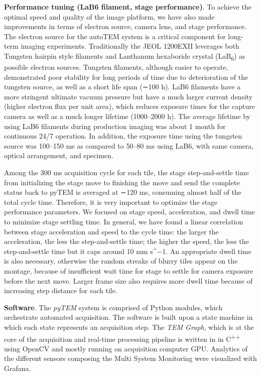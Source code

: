 \documentclass{article}
\begin{document}
{\noindent\textbf{Performance tuning (LaB6 filament, stage performance)}. To achieve the optimal speed and quality of the image platform, we have also made improvements in terms of electron source, camera lens, and stage performance. The electron source for the autoTEM system is a critical component for long-term imaging experiments. Traditionally the JEOL 1200EXII leverages both Tungsten hairpin style filaments and Lanthanum hexaboride crystal (LaB\textsubscript{6}) as possible electron sources. Tungsten filaments, although easier to operate, demonstrated poor stability for long periods of time due to deterioration of the tungsten source, as well as a short life span (∼100 h). LaB6 filaments have a more stringent ultimate vacuum pressure but have a much larger current density (higher electron flux per unit area), which reduces exposure times for the capture camera as well as a much longer lifetime (1000–2000 h). The average lifetime by using LaB6 filaments during production imaging was about 1 month for continuous 24/7 operation. In addition, the exposure time using the tungsten source was 100–150 ms as compared to 50–80 ms using LaB6, with same camera, optical arrangement, and specimen.

Among the 300 ms acquisition cycle for each tile, the stage step-and-settle time from initializing the stage move to finishing the move and send the complete status back to pyTEM is averaged at ∼120 ms, consuming almost half of the total cycle time. Therefore, it is very important to optimize the stage performance parameters. We focused on stage speed, acceleration, and dwell time to minimize stage settling time. In general, we have found a linear correlation between stage acceleration and speed to the cycle time: the larger the acceleration, the less the step-and-settle time; the higher the speed, the less the step-and-settle time but it caps around 10 mm s\textasciicircum{}−1. An appropriate dwell time is also necessary, otherwise the random streaks of blurry tiles appear on the montage, because of insufficient wait time for stage to settle for camera exposure before the next move. Larger frame size also requires more dwell time because of increasing step distance for each tile.

\noindent\textbf{Software}. The \emph{pyTEM} system is comprised of Python modules, which orchestrate automated acquisition. The software is built upon a state machine in which each state represents an acquisition step. The \emph{TEM Graph}, which is at the core of the acquisition and real-time processing pipeline is written in in C\textsuperscript{++} using OpenCV and mostly running on acquisition computer GPU. Analytics of the different sensors composing the Multi System Monitoring were visualized with Grafana.

}
\end{document}
